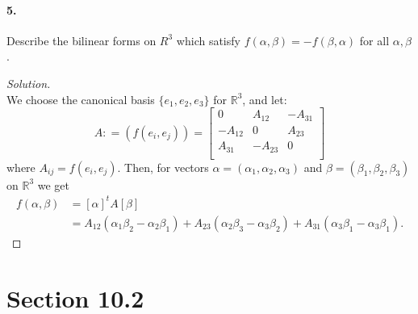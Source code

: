 \documentclass{article}
\theoremstyle{plain}
\theoremstyle{definition}
\theoremstyle{remark}
\renewcommand{\Re}{\mathbb{R}}
\begin{document}
    \paragraph{5.}
      Describe the bilinear forms on $R^3$ which satisfy $f(\alpha,\beta) = -f(\beta,\alpha)$ for all $\alpha,\beta$.
      \begin{proof}[Solution]$ $\\
        We choose the canonical basis $\{e_1,e_2,e_3\}$ for $\Re^3$, and let:
        $$
        A : = (f(e_i,e_j)) = \begin{bmatrix}
                                0       & A_{12}  & -A_{31} \\
                                -A_{12} & 0       & A_{23} \\
                                A_{31} & -A_{23} & 0       \\
                              \end{bmatrix}
        $$
        where $A_{ij} = f(e_i,e_j)$. Then, for vectors $\alpha=(\alpha_1,\alpha_2,\alpha_3)$ and $\beta=(\beta_1,\beta_2,\beta_3)$ on $\Re^3$ we get
        \begin{align*}
          f(\alpha,\beta)   & = [\alpha]^t A [\beta] \\
                            & = A_{12}(\alpha_1 \beta_2 - \alpha_2\beta_1) + A_{23}(\alpha_2 \beta_3 - \alpha_3\beta_2) + A_{31}(\alpha_3 \beta_1 - \alpha_3\beta_1).
        \end{align*}

      \end{proof}
  \section*{Section 10.2}
\end{document}
